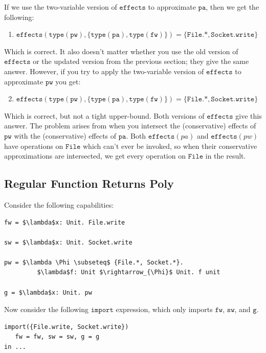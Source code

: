 \documentclass{llncs}
\newcommand{\keywadj}[1]{\mathtt{#1}}
\newcommand{\kwa}[1]{\keywadj{ #1 }}
\newcommand{\fx}[1]{ \kwa{effects}(#1) }
\begin{document}
\noindent
If we use the two-variable version of $\kwa{effects}$ to approximate $\kwa{pa}$, then we get the following:

\begin{enumerate}
	\item $\kwa{effects(type(pw), \{type(pa), type(fw)\}) = \{ File.*, Socket.write \}}$
\end{enumerate}

\noindent
Which is correct. It also doesn't matter whether you use the old version of $\kwa{effects}$ or the updated version from the previous section; they give the same answer. However, if you try to apply the two-variable version of $\kwa{effects}$ to approximate $\kwa{pw}$ you get:

\begin{enumerate}
	\setcounter{enumi}{1}
	\item $\kwa{effects(type(pw), \{type(pa), type(fw)\}) = \{File.*, Socket.write\}}$
\end{enumerate}

Which is correct, but not a tight upper-bound. Both versions of $\kwa{effects}$ give this answer. The problem arises from when you intersect the (conservative) effects of $\kwa{pw}$ with the (conservative) effects of $\kwa{pa}$. Both $\fx{pa}$ and $\fx{pw}$ have operations on $\kwa{File}$ which can't ever be invoked, so when their conservative approximations are intersected, we get every operation on $\kwa{File}$ in the result.

\subsection{Regular Function Returns Poly}

Consider the following capabilities:

\begin{lstlisting}
fw = $\lambda$x: Unit. File.write

sw = $\lambda$x: Unit. Socket.write

pw = $\lambda \Phi \subseteq$ {File.*, Socket.*}.
         $\lambda$f: Unit $\rightarrow_{\Phi}$ Unit. f unit

g = $\lambda$x: Unit. pw
\end{lstlisting}

\noindent
Now consider the following $\kwa{import}$ expression, which only imports $\kwa{fw}$, $\kwa{sw}$, and $\kwa{g}$.

\begin{lstlisting}
import({File.write, Socket.write})
   fw = fw, sw = sw, g = g
in ...
\end{lstlisting}
\end{document}
